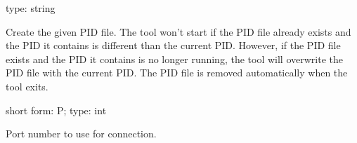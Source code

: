 \documentclass[letterpaper,10pt,english]{sphinxmanual}
\begin{document}
\begin{fulllineitems}
\label{\detokenize{mariadb-index-checker:cmdoption-mariadb-index-checker-pid}}
type: string

Create the given PID file.  The tool won’t start if the PID file already
exists and the PID it contains is different than the current PID.  However,
if the PID file exists and the PID it contains is no longer running, the
tool will overwrite the PID file with the current PID.  The PID file is
removed automatically when the tool exits.

\end{fulllineitems}


\begin{fulllineitems}
\label{\detokenize{mariadb-index-checker:cmdoption-mariadb-index-checker-port}}
short form: \sphinxhyphen{}P; type: int

Port number to use for connection.

\end{fulllineitems}

\end{document}
